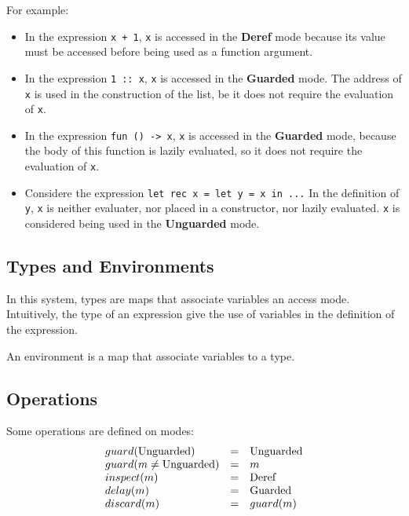 \documentclass{article}
\newcommand{\code}[1]{\text{\lstinline"#1"}}
\begin{document}
For example:
\begin{itemize}
  \item In the expression \lstinline|x + 1|, \lstinline|x| is accessed in the
    \textbf{Deref} mode because its value must be accessed before being used as
    a function argument.
  \item In the expression \lstinline|1 :: x|, \lstinline|x| is accessed in the
    \textbf{Guarded} mode. The address of \lstinline|x| is used in the
    construction of the list, be it does not require the evaluation of
    \lstinline|x|.
  \item In the expression \lstinline|fun () -> x|, \lstinline|x| is accessed in
    the \textbf{Guarded} mode, because the body of this function is lazily
    evaluated, so it does not require the evaluation of \lstinline|x|.
  \item Considere the expression \lstinline |let rec x = let y = x in ...|
    In the definition of \lstinline|y|, \lstinline|x| is neither evaluater, nor
    placed in a constructor, nor lazily evaluated. \lstinline|x| is considered
    being used in the \textbf{Unguarded} mode.
\end{itemize}

\subsection{Types and Environments}
In this system, types are maps that associate variables an access mode.
Intuitively, the type of an expression give the use of variables in the
definition of the expression.

An environment is a map that associate variables to a type.

\subsection{Operations}
Some operations are defined on modes:
\begin{displaymath}
  \begin{array}{lll}
    guard(\code{Unguarded})        & = & \code{Unguarded} \\
    guard(m \neq \code{Unguarded}) & = & m                \\
    inspect(m)                     & = & \code{Deref}     \\
    delay(m)                       & = & \code{Guarded}   \\
    discard(m)                     & = & guard(m)
  \end{array}
\end{displaymath}
\end{document}
